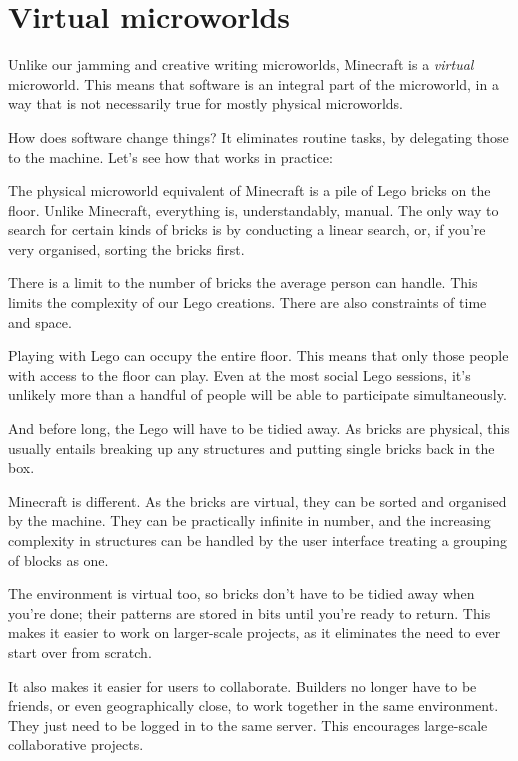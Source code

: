 \section{Virtual microworlds}

Unlike our jamming and creative writing microworlds, Minecraft is a
\emph{virtual} microworld. This means that software is an integral part
of the microworld, in a way that is not necessarily true for mostly
physical microworlds.

How does software change things? It eliminates routine tasks, by
delegating those to the machine. Let's see how that works in practice:

The physical microworld equivalent of Minecraft is a pile of Lego bricks
on the floor. Unlike Minecraft, everything is, understandably, manual.
The only way to search for certain kinds of bricks is by conducting a
linear search, or, if you're very organised, sorting the bricks first.

There is a limit to the number of bricks the average person can handle.
This limits the complexity of our Lego creations. There are also
constraints of time and space.

Playing with Lego can occupy the entire floor. This means that only
those people with access to the floor can play. Even at the most social
Lego sessions, it's unlikely more than a handful of people will be able
to participate simultaneously.

And before long, the Lego will have to be tidied away. As bricks are
physical, this usually entails breaking up any structures and putting
single bricks back in the box.

Minecraft is different. As the bricks are virtual, they can be sorted
and organised by the machine. They can be practically infinite in
number, and the increasing complexity in structures can be handled by
the user interface treating a grouping of blocks as one.

The environment is virtual too, so bricks don't have to be tidied away
when you're done; their patterns are stored in bits until you're ready
to return. This makes it easier to work on larger-scale projects, as it
eliminates the need to ever start over from scratch.

It also makes it easier for users to collaborate. Builders no longer
have to be friends, or even geographically close, to work
together in the same environment. They just need to be logged in to the
same server. This encourages large-scale collaborative projects.

